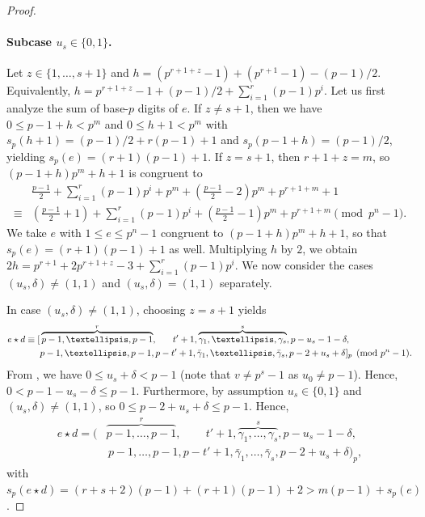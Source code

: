 \documentclass[10pt,a4paper]{amsart}
\newcommand{\comp}[1]{\bar{#1}}
\newcommand{\wt}{s_p}
\begin{document}
\begin{proof}
\paragraph{Subcase $u_s \in \{0, 1\}$.} Let $z \in \{1,\dots,s+1\}$ and $h = (p^{r + 1 + z} - 1) + (p^{r + 1} - 1) - (p - 1)/2$. Equivalently, $h = p^{r + 1 + z} - 1 + (p - 1)/2 + \sum_{i = 1}^r (p - 1)p^i$.
Let us first analyze the sum of base-$p$ digits of $e$. If $z \neq s+1$, then we have $0 \leq p-1+h <p^m$ and $0 \leq h+1 < p^m$ with $\wt(h+1) = (p-1)/2 + r(p-1) + 1$ and $\wt(p-1+h) = (p - 1)/2$, yielding $\wt(e) = (r+1)(p-1) +1$. If $z = s+1$, then $r+1+z = m$, so $(p-1+h)p^m + h+1$ is congruent to
\begin{align*}
&\frac{p-1}{2} + \sum_{i=1}^r(p-1)p^i + p^m + \left(\frac{p-1}{2}-2\right)p^m + p^{r+1+m} + 1 \\
\equiv &\left(\frac{p-1}{2}+1\right) + \sum_{i=1}^r(p-1)p^i + \left(\frac{p-1}{2}-1\right)p^m + p^{r+1+m} \pmod{p^n - 1}.
\end{align*}
We take $e$ with $1 \leq e \leq p^n-1$ congruent to $(p-1+h)p^m + h+1$, so that
$\wt(e) = (r+1)(p-1) + 1$ as well. 
Multiplying $h$ by $2$, we obtain $2h = p^{r+1} + 2p^{r+1+z} -3 + \sum_{i=1}^r(p-1)p^i$.
We now consider the cases $(u_s,\delta) \neq (1,1)$  and $(u_s,\delta) = (1,1)$ separately.

In case $(u_s,\delta) \neq (1,1)$, choosing $z = s+1$ yields
\begin{align*}
e \star d \equiv [&\overbrace{p-1,\dots,p-1}^r,\hphantom{p-}\;\,t'+1,\overbrace{\gamma_1,\dots,\gamma_s}^s, p-u_s-1-\delta,\\ &p-1,\dots,p-1,p-t'+1, \comp{\gamma}_1,\dots,\comp{\gamma}_s,p-2+u_s+\delta]_p \pmod {p^n-1}. 
\end{align*}
From , we have $0 \le u_s + \delta < p - 1$ (note that $v \neq p^s - 1$ as $u_0 \neq p - 1$). Hence, $0 < p - 1 - u_s - \delta \le p - 1$.
Furthermore, by assumption $u_s \in \{0, 1\}$ and $(u_s, \delta) \neq (1, 1)$, so $0 \le p - 2 + u_s + \delta \le p - 1$. Hence,
\begin{align*}
e \star d = (&\overbrace{p-1,\dots,p-1}^r,\phantom{p-}\;\, t'+1,\overbrace{\gamma_1,\dots,\gamma_s}^s, p-u_s-1-\delta,\\ &\,p-1,\dots,p-1,p-t'+1, \comp{\gamma}_1,\dots,\comp{\gamma}_s,p-2+u_s+\delta)_p,
\end{align*}
with $\wt(e \star d) = (r+s+2)(p-1)+ (r+1)(p-1) + 2 > m(p - 1)+ \wt(e)$.


\end{proof}
\end{document}
